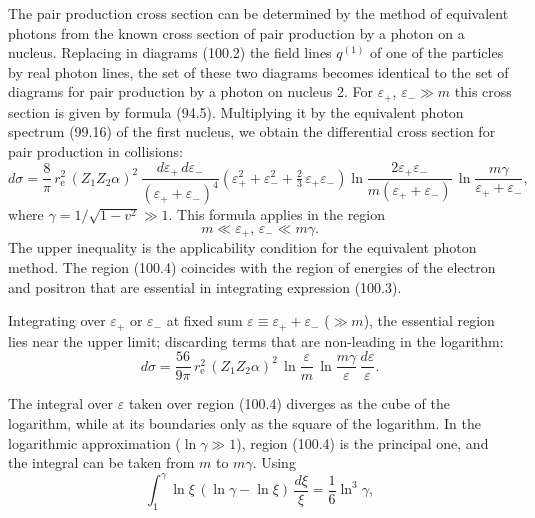 
The pair production cross section can be determined by the method of equivalent photons from the known cross section of pair production by a photon on a nucleus. Replacing in diagrams (100.2) the field lines $q^{(1)}$ of one of the particles by real photon lines, the set of these two diagrams becomes identical to the set of diagrams for pair production by a photon on nucleus 2. For $\varepsilon_+,\,\varepsilon_- \gg m$ this cross section is given by formula (94.5). Multiplying it by the equivalent photon spectrum (99.16) of the first nucleus, we obtain the differential cross section for pair production in collisions:
\begin{equation}
d\sigma = \frac{8}{\pi}\,r_\mathrm{e}^2\,(Z_1 Z_2 \alpha)^2\,\frac{d\varepsilon_+\,d\varepsilon_-}{(\varepsilon_+ + \varepsilon_-)^4}\left(\varepsilon_+^2 + \varepsilon_-^2 + \tfrac{2}{3}\,\varepsilon_+\varepsilon_-\right)\ln\frac{2\varepsilon_+\varepsilon_-}{m(\varepsilon_+ + \varepsilon_-)}\,\ln\frac{m\gamma}{\varepsilon_+ + \varepsilon_-},
\label{eq:100.3}
\end{equation}
where $\gamma = 1/\sqrt{1 - v^2} \gg 1$. This formula applies in the region
\begin{equation}
m \ll \varepsilon_+,\,\varepsilon_- \ll m\gamma.
\label{eq:100.4}
\end{equation}
The upper inequality is the applicability condition for the equivalent photon method. The region (100.4) coincides with the region of energies of the electron and positron that are essential in integrating expression (100.3).

Integrating over $\varepsilon_+$ or $\varepsilon_-$ at fixed sum $\varepsilon \equiv \varepsilon_+ + \varepsilon_-$ ($\gg m$), the essential region lies near the upper limit; discarding terms that are non-leading in the logarithm:
\[
d\sigma = \frac{56}{9\pi}\,r_\mathrm{e}^2\,(Z_1 Z_2 \alpha)^2\,\ln\frac{\varepsilon}{m}\,\ln\frac{m\gamma}{\varepsilon}\,\frac{d\varepsilon}{\varepsilon}.
\]

The integral over $\varepsilon$ taken over region (100.4) diverges as the cube of the logarithm, while at its boundaries only as the square of the logarithm. In the logarithmic approximation ($\ln\gamma \gg 1$), region (100.4) is the principal one, and the integral can be taken from $m$ to $m\gamma$. Using
\[
\int_1^\gamma \ln\xi\,(\ln\gamma - \ln\xi)\,\frac{d\xi}{\xi} = \frac{1}{6}\ln^3\gamma,
\]


